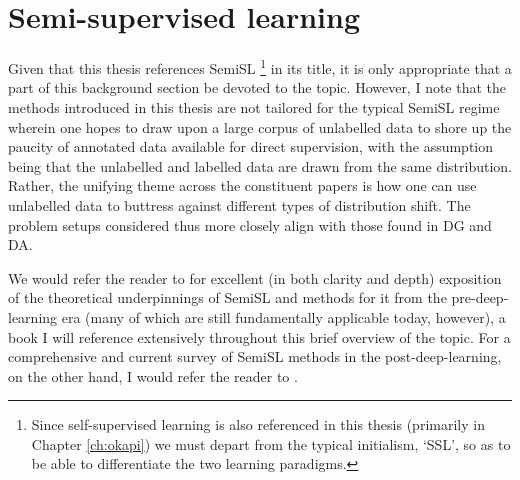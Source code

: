 \section{ Semi-supervised learning }\label{sec:semisl}
%
Given that this thesis references \ac{SemiSL}
%
\footnote{ 
  Since self-supervised learning is also referenced in this thesis (primarily in Chapter
  \ref{ch:okapi}) we must depart from the typical initialism, `SSL', so as to be able to
  differentiate the two learning paradigms.
%
}
%
in its title, it is only appropriate that a part of this background section be devoted to the
topic.
%
However, I note that the methods introduced in this thesis are not tailored for the typical
\ac{SemiSL} regime wherein one hopes to draw upon a large corpus of unlabelled data to shore up the
paucity of annotated data available for direct supervision, with the assumption being that the
unlabelled and labelled data are drawn from the same distribution.
%
Rather, the unifying theme across the constituent papers is how one can use unlabelled data to
buttress against different types of distribution shift.
%
The problem setups considered thus more closely align with those found in \ac{DG} and \ac{DA}. 

We would refer the reader to \cite{chapelle2009semi} for excellent (in both clarity and depth)
exposition of the theoretical underpinnings of \ac{SemiSL} and methods for it from the
pre-deep-learning era (many of which are still fundamentally applicable today, however), a book I
will reference extensively throughout this brief overview of the topic.
%
For a comprehensive and current survey of \ac{SemiSL} methods in the post-deep-learning, on the other
hand, I would refer the reader to \cite{yang2022survey}.
%

